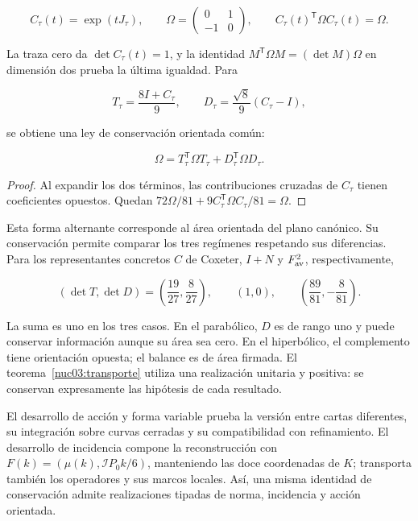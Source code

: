 \[
C_\tau(t)=\exp(tJ_\tau),\qquad
\Omega=\begin{pmatrix}0&1\\-1&0\end{pmatrix},\qquad
C_\tau(t)^\mathsf T\Omega C_\tau(t)=\Omega.
\]

La traza cero da \(\det C_\tau(t)=1\), y la identidad \(M^\mathsf T\Omega M=(\det M)\Omega\) en dimensión dos prueba la última igualdad. Para

\[
T_\tau=\frac{8I+C_\tau}{9},\qquad
D_\tau=\frac{\sqrt8}{9}(C_\tau-I),
\]

se obtiene una ley de conservación orientada común:

\begin{equation}
\boxed{\Omega=T_\tau^\mathsf T\Omega T_\tau+D_\tau^\mathsf T\Omega D_\tau.}
\label{nuc03:eq:22}
\end{equation}

\begin{proof}
Al expandir los dos términos, las contribuciones cruzadas de \(C_\tau\) tienen coeficientes opuestos. Quedan \(72\Omega/81+9C_\tau^\mathsf T\Omega C_\tau/81=\Omega\).
\end{proof}

Esta forma alternante corresponde al área orientada del plano canónico. Su conservación permite comparar los tres regímenes respetando sus diferencias. Para los representantes concretos \(C\) de Coxeter, \(I+N\) y \(F_{\rm av}^2\), respectivamente,

\begin{equation}
(\det T,\det D)=
\left(\frac{19}{27},\frac8{27}\right),\qquad
(1,0),\qquad
\left(\frac{89}{81},-\frac8{81}\right).
\label{nuc03:eq:23}
\end{equation}

La suma es uno en los tres casos. En el parabólico, \(D\) es de rango uno y puede conservar información aunque su área sea cero. En el hiperbólico, el complemento tiene orientación opuesta; el balance es de área firmada. El teorema~\ref{nuc03:transporte} utiliza una realización unitaria y positiva: se conservan expresamente las hipótesis de cada resultado.

El desarrollo de acción y forma variable prueba la versión entre cartas diferentes, su integración sobre curvas cerradas y su compatibilidad con refinamiento. El desarrollo de incidencia compone la reconstrucción con \(F(k)=(\mu(k),\mathcal I P_0k/6)\), manteniendo las doce coordenadas de \(K\); transporta también los operadores y sus marcos locales. Así, una misma identidad de conservación admite realizaciones tipadas de norma, incidencia y acción orientada.

